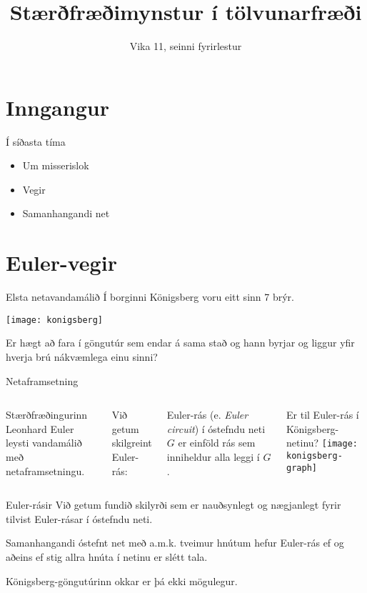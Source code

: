 \documentclass[handout]{beamer}
\title{Stærðfræðimynstur í tölvunarfræði}
\subtitle{Vika 11, seinni fyrirlestur}
\begin{document}
\begin{frame}
\titlepage
\end{frame}


\section{Inngangur}

\begin{frame}{Í síðasta tíma}
\begin{itemize}
 \item Um misserislok
 \item Vegir 
 \item Samanhangandi net
\end{itemize}
\end{frame}

\section{Euler-vegir}

\begin{frame}{Elsta netavandamálið}
Í borginni Königsberg voru eitt sinn 7 brýr.
\begin{center}
\texttt{[image: konigsberg]}
\end{center}
Er hægt að fara í göngutúr sem endar á sama stað og hann byrjar og liggur yfir hverja brú nákvæmlega einu sinni?
\end{frame}

\begin{frame}{Netaframsetning}
\begin{columns}
Stærðfræðingurinn Leonhard Euler leysti vandamálið með netaframsetningu.

Við getum skilgreint Euler-rás:

\begin{tcolorbox}[title=Euler-rás]
Euler-rás (e. \emph{Euler circuit}) í óstefndu neti $G$ er einföld rás sem inniheldur alla leggi í $G$.
\end{tcolorbox}
Er til Euler-rás í Königsberg-netinu?
\texttt{[image: konigsberg-graph]}
\end{columns}
\end{frame}

\begin{frame}{Euler-rásir}
Við getum fundið skilyrði sem er nauðsynlegt og nægjanlegt fyrir tilvist Euler-rásar í óstefndu neti.

\begin{tcolorbox}
Samanhangandi óstefnt net með a.m.k. tveimur hnútum hefur Euler-rás ef og aðeins ef stig allra hnúta í netinu er slétt tala.
\end{tcolorbox}

Königsberg-göngutúrinn okkar er þá ekki mögulegur.
\end{frame}
\end{document}
